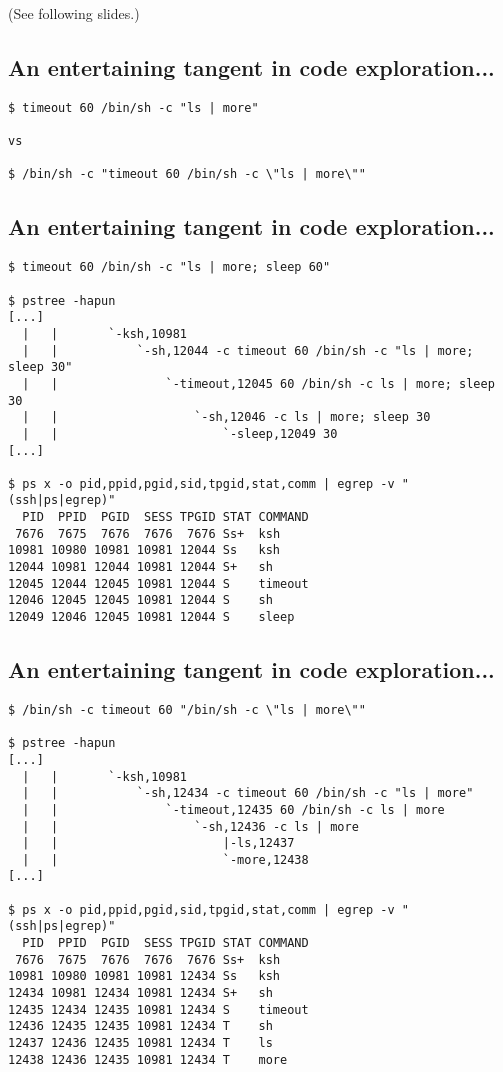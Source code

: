 \documentclass[xga]{xdvislides}
\newcommand{\smallish}{\fontsize{18}{18}\selectfont}
\begin{document}
(See following slides.)

\subsection{An entertaining tangent in code exploration...}
\begin{verbatim}
$ timeout 60 /bin/sh -c "ls | more"

vs

$ /bin/sh -c "timeout 60 /bin/sh -c \"ls | more\""
\end{verbatim}

\subsection{An entertaining tangent in code exploration...}
\smallish
\begin{verbatim}
$ timeout 60 /bin/sh -c "ls | more; sleep 60"

$ pstree -hapun
[...]
  |   |       `-ksh,10981
  |   |           `-sh,12044 -c timeout 60 /bin/sh -c "ls | more; sleep 30"
  |   |               `-timeout,12045 60 /bin/sh -c ls | more; sleep 30
  |   |                   `-sh,12046 -c ls | more; sleep 30
  |   |                       `-sleep,12049 30
[...]

$ ps x -o pid,ppid,pgid,sid,tpgid,stat,comm | egrep -v "(ssh|ps|egrep)"
  PID  PPID  PGID  SESS TPGID STAT COMMAND
 7676  7675  7676  7676  7676 Ss+  ksh
10981 10980 10981 10981 12044 Ss   ksh
12044 10981 12044 10981 12044 S+   sh
12045 12044 12045 10981 12044 S    timeout
12046 12045 12045 10981 12044 S    sh
12049 12046 12045 10981 12044 S    sleep
\end{verbatim}

\subsection{An entertaining tangent in code exploration...}
\smallish
\begin{verbatim}
$ /bin/sh -c timeout 60 "/bin/sh -c \"ls | more\""

$ pstree -hapun
[...]
  |   |       `-ksh,10981
  |   |           `-sh,12434 -c timeout 60 /bin/sh -c "ls | more"
  |   |               `-timeout,12435 60 /bin/sh -c ls | more
  |   |                   `-sh,12436 -c ls | more
  |   |                       |-ls,12437
  |   |                       `-more,12438
[...]

$ ps x -o pid,ppid,pgid,sid,tpgid,stat,comm | egrep -v "(ssh|ps|egrep)"
  PID  PPID  PGID  SESS TPGID STAT COMMAND
 7676  7675  7676  7676  7676 Ss+  ksh
10981 10980 10981 10981 12434 Ss   ksh
12434 10981 12434 10981 12434 S+   sh
12435 12434 12435 10981 12434 S    timeout
12436 12435 12435 10981 12434 T    sh
12437 12436 12435 10981 12434 T    ls
12438 12436 12435 10981 12434 T    more
\end{verbatim}
\end{document}
